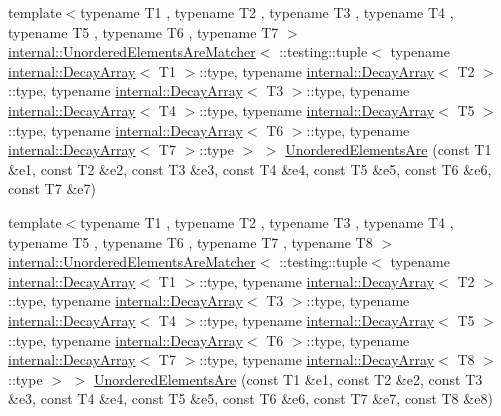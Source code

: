 \begin{DoxyCompactItemize}
{\footnotesize template$<$typename T1 , typename T2 , typename T3 , typename T4 , typename T5 , typename T6 , typename T7 $>$ }\\\hyperlink{classtesting_1_1internal_1_1_unordered_elements_are_matcher}{internal\+::\+Unordered\+Elements\+Are\+Matcher}$<$ \+::testing\+::tuple$<$ typename \hyperlink{structtesting_1_1internal_1_1_decay_array}{internal\+::\+Decay\+Array}$<$ T1 $>$\+::type, typename \hyperlink{structtesting_1_1internal_1_1_decay_array}{internal\+::\+Decay\+Array}$<$ T2 $>$\+::type, typename \hyperlink{structtesting_1_1internal_1_1_decay_array}{internal\+::\+Decay\+Array}$<$ T3 $>$\+::type, typename \hyperlink{structtesting_1_1internal_1_1_decay_array}{internal\+::\+Decay\+Array}$<$ T4 $>$\+::type, typename \hyperlink{structtesting_1_1internal_1_1_decay_array}{internal\+::\+Decay\+Array}$<$ T5 $>$\+::type, typename \hyperlink{structtesting_1_1internal_1_1_decay_array}{internal\+::\+Decay\+Array}$<$ T6 $>$\+::type, typename \hyperlink{structtesting_1_1internal_1_1_decay_array}{internal\+::\+Decay\+Array}$<$ T7 $>$\+::type $>$ $>$ \hyperlink{namespacetesting_add6e16fe24c45e39e92c0d19c04acf11}{Unordered\+Elements\+Are} (const T1 \&e1, const T2 \&e2, const T3 \&e3, const T4 \&e4, const T5 \&e5, const T6 \&e6, const T7 \&e7)
\item 
{\footnotesize template$<$typename T1 , typename T2 , typename T3 , typename T4 , typename T5 , typename T6 , typename T7 , typename T8 $>$ }\\\hyperlink{classtesting_1_1internal_1_1_unordered_elements_are_matcher}{internal\+::\+Unordered\+Elements\+Are\+Matcher}$<$ \+::testing\+::tuple$<$ typename \hyperlink{structtesting_1_1internal_1_1_decay_array}{internal\+::\+Decay\+Array}$<$ T1 $>$\+::type, typename \hyperlink{structtesting_1_1internal_1_1_decay_array}{internal\+::\+Decay\+Array}$<$ T2 $>$\+::type, typename \hyperlink{structtesting_1_1internal_1_1_decay_array}{internal\+::\+Decay\+Array}$<$ T3 $>$\+::type, typename \hyperlink{structtesting_1_1internal_1_1_decay_array}{internal\+::\+Decay\+Array}$<$ T4 $>$\+::type, typename \hyperlink{structtesting_1_1internal_1_1_decay_array}{internal\+::\+Decay\+Array}$<$ T5 $>$\+::type, typename \hyperlink{structtesting_1_1internal_1_1_decay_array}{internal\+::\+Decay\+Array}$<$ T6 $>$\+::type, typename \hyperlink{structtesting_1_1internal_1_1_decay_array}{internal\+::\+Decay\+Array}$<$ T7 $>$\+::type, typename \hyperlink{structtesting_1_1internal_1_1_decay_array}{internal\+::\+Decay\+Array}$<$ T8 $>$\+::type $>$ $>$ \hyperlink{namespacetesting_a0f30358234947d21c7f39f15a8395d04}{Unordered\+Elements\+Are} (const T1 \&e1, const T2 \&e2, const T3 \&e3, const T4 \&e4, const T5 \&e5, const T6 \&e6, const T7 \&e7, const T8 \&e8)

\end{DoxyCompactItemize}
